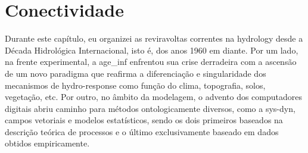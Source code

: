 \documentclass[./main.tex]{subfiles}
\begin{document}
\section{Conectividade}

\par Durante este capítulo, eu organizei as reviravoltas correntes na \gls{hydrology} desde a Década Hidrológica Internacional, isto é, dos anos 1960 em diante. Por um lado, na frente experimental, a \gls{age_inf} enfrentou sua crise derradeira com a ascensão de um novo \gls{paradigma} que reafirma a diferenciação e singularidade dos mecanismos de \gls{hydro-response} como função do clima, topografia, solos, vegetação, etc. Por outro, no âmbito da modelagem, o advento dos computadores digitais abriu caminho para métodos ontologicamente diversos, como a \gls{sys-dyn}, campos vetoriais e modelos estatísticos, sendo os dois primeiros baseados na descrição teórica de processos e o último exclusivamente baseado em dados obtidos empiricamente.
\end{document}
